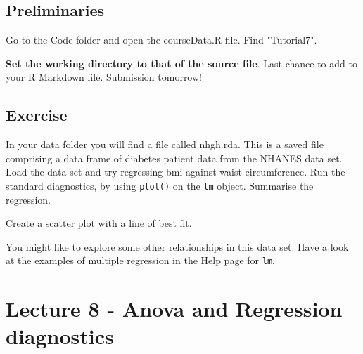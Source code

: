 \documentclass[titlepage]{book}\usepackage{knitr}
\begin{document}
\section{Preliminaries}

Go to the Code folder and open the courseData.R file.  Find "Tutorial7".

\textbf{Set the working directory to that of the source file}.
Last chance to add to your R Markdown file.  Submission tomorrow!

\section{Exercise} 

In your data folder you will find a file called nhgh.rda.  This is a saved file comprising a data frame of diabetes patient data from the NHANES data set.  Load the data set and try regressing bmi against waist circumference.  Run the standard diagnostics, by using \texttt{plot()} on the \texttt{lm} object. Summarise the regression. 

Create a scatter plot with a line of best fit.

You might like to explore some other relationships in this data set. Have a look at the examples of multiple regression in the Help page for \texttt{lm}.

\begin{knitrout}
\color{fgcolor}\begin{kframe}
\begin{alltt}
\hlstd{(}\hlstd{)}
\end{alltt}
\end{kframe}
\end{knitrout}















\chapter{Lecture 8 - Anova and Regression diagnostics }
\end{document}
